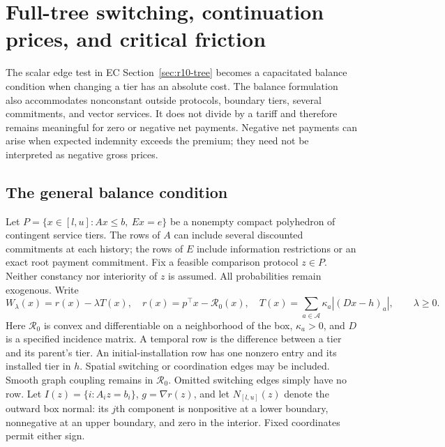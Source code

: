 \documentclass[11pt,letterpaper]{article}
\theoremstyle{definition}
\newcommand{\1}{\mathbf 1}
\begin{document}


\section{Full-tree switching, continuation prices, and critical friction}\label{sec:r12-network}
The scalar edge test in EC Section~\ref{sec:r10-tree} becomes a capacitated balance condition when changing a tier has an absolute cost. The balance formulation also accommodates nonconstant outside protocols, boundary tiers, several commitments, and vector services. It does not divide by a tariff and therefore remains meaningful for zero or negative net payments. Negative net payments can arise when expected indemnity exceeds the premium; they need not be interpreted as negative gross prices.

\subsection{The general balance condition}
Let $P=\{x\in[l,u]:Ax\leq b,\ Ex=e\}$ be a nonempty compact polyhedron of contingent service tiers. The rows of $A$ can include several discounted commitments at each history; the rows of $E$ include information restrictions or an exact root payment commitment. Fix a feasible comparison protocol $z\in P$. Neither constancy nor interiority of $z$ is assumed. All probabilities remain exogenous. Write
\begin{equation}\label{eq:r12-problem}
 W_\lambda(x)=r(x)-\lambda T(x),\quad r(x)=p^\top x-\mathcal R_0(x),\quad
 T(x)=\sum_{a\in\mathcal A}\kappa_a |(Dx-h)_a|,
 \qquad\lambda\geq0.
\end{equation}
Here $\mathcal R_0$ is convex and differentiable on a neighborhood of the box, $\kappa_a>0$, and $D$ is a specified incidence matrix. A temporal row is the difference between a tier and its parent's tier. An initial-installation row has one nonzero entry and its installed tier in $h$. Spatial switching or coordination edges may be included. Smooth graph coupling remains in $\mathcal R_0$. Omitted switching edges simply have no row. Let $I(z)=\{i:A_i z=b_i\}$, $g=\nabla r(z)$, and let $N_{[l,u]}(z)$ denote the outward box normal: its $j$th component is nonpositive at a lower boundary, nonnegative at an upper boundary, and zero in the interior. Fixed coordinates permit either sign.
\end{document}
